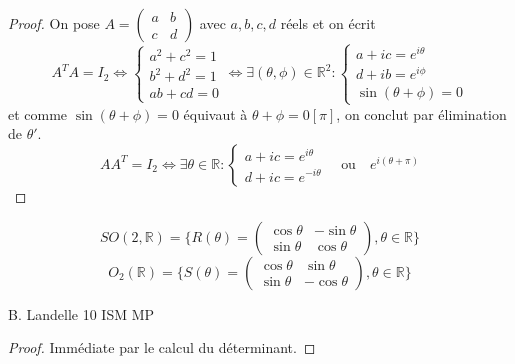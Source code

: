 \begin{proof}

On pose $A = \begin{pmatrix} a & b \\ c & d \end{pmatrix}$ avec $a, b, c, d$ réels et on écrit
\[
A^T A = I_2 \iff
\begin{cases}
a^2 + c^2 = 1 \\
b^2 + d^2 = 1 \\
ab + cd = 0
\end{cases}
\iff \exists (\theta, \phi) \in \mathbb{R}^2 :
\begin{cases}
a + ic = e^{i\theta} \\
d + ib = e^{i\phi} \\
\sin(\theta + \phi) = 0
\end{cases}
\]
et comme $\sin(\theta + \phi) = 0$ équivaut à $\theta + \phi = 0 [\pi]$, on conclut par élimination de $\theta'$.\[
A A^T = I_2 \iff \exists \theta \in \mathbb{R} :
\begin{cases}
a + ic = e^{i\theta} \\
d + ic = e^{-i\theta}
\end{cases}
\quad \text{ou} \quad
e^{i(\theta+\pi)}
\]

\end{proof}

\begin{corollary}
\label{cor:3}

\[
SO(2,\mathbb{R}) = \{R(\theta) = \begin{pmatrix}
\cos \theta & -\sin \theta \\
\sin \theta & \cos \theta
\end{pmatrix}, \theta \in \mathbb{R}\}
\]
\[
O_2(\mathbb{R}) = \{S(\theta) = \begin{pmatrix}
\cos \theta & \sin \theta \\
\sin \theta & -\cos \theta
\end{pmatrix}, \theta \in \mathbb{R}\}
\]

B. Landelle \hfill 10 \hfill ISM MP


\end{corollary}

\begin{proof}

Immédiate par le calcul du déterminant.

\end{proof}

